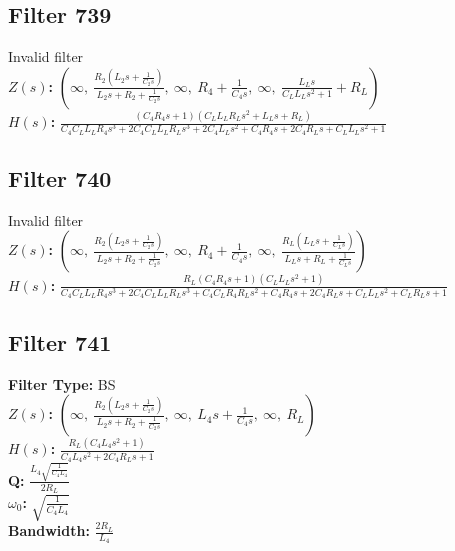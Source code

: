 \documentclass{article}
\begin{document}
\subsection*{Filter 739}
Invalid filter \\ 
\textbf{$Z(s)$:} $\left( \infty, \  \frac{R_{2} \left(L_{2} s + \frac{1}{C_{2} s}\right)}{L_{2} s + R_{2} + \frac{1}{C_{2} s}}, \  \infty, \  R_{4} + \frac{1}{C_{4} s}, \  \infty, \  \frac{L_{L} s}{C_{L} L_{L} s^{2} + 1} + R_{L}\right)$ \\ 
\textbf{$H(s)$:} $\frac{\left(C_{4} R_{4} s + 1\right) \left(C_{L} L_{L} R_{L} s^{2} + L_{L} s + R_{L}\right)}{C_{4} C_{L} L_{L} R_{4} s^{3} + 2 C_{4} C_{L} L_{L} R_{L} s^{3} + 2 C_{4} L_{L} s^{2} + C_{4} R_{4} s + 2 C_{4} R_{L} s + C_{L} L_{L} s^{2} + 1}$ \\ 
\subsection*{Filter 740}
Invalid filter \\ 
\textbf{$Z(s)$:} $\left( \infty, \  \frac{R_{2} \left(L_{2} s + \frac{1}{C_{2} s}\right)}{L_{2} s + R_{2} + \frac{1}{C_{2} s}}, \  \infty, \  R_{4} + \frac{1}{C_{4} s}, \  \infty, \  \frac{R_{L} \left(L_{L} s + \frac{1}{C_{L} s}\right)}{L_{L} s + R_{L} + \frac{1}{C_{L} s}}\right)$ \\ 
\textbf{$H(s)$:} $\frac{R_{L} \left(C_{4} R_{4} s + 1\right) \left(C_{L} L_{L} s^{2} + 1\right)}{C_{4} C_{L} L_{L} R_{4} s^{3} + 2 C_{4} C_{L} L_{L} R_{L} s^{3} + C_{4} C_{L} R_{4} R_{L} s^{2} + C_{4} R_{4} s + 2 C_{4} R_{L} s + C_{L} L_{L} s^{2} + C_{L} R_{L} s + 1}$ \\ 
\subsection*{Filter 741}
\textbf{Filter Type:} BS \\ 
\textbf{$Z(s)$:} $\left( \infty, \  \frac{R_{2} \left(L_{2} s + \frac{1}{C_{2} s}\right)}{L_{2} s + R_{2} + \frac{1}{C_{2} s}}, \  \infty, \  L_{4} s + \frac{1}{C_{4} s}, \  \infty, \  R_{L}\right)$ \\ 
\textbf{$H(s)$:} $\frac{R_{L} \left(C_{4} L_{4} s^{2} + 1\right)}{C_{4} L_{4} s^{2} + 2 C_{4} R_{L} s + 1}$ \\ 
\textbf{Q:} $\frac{L_{4} \sqrt{\frac{1}{C_{4} L_{4}}}}{2 R_{L}}$ \\ 
\textbf{$\omega_0$:} $\sqrt{\frac{1}{C_{4} L_{4}}}$ \\ 
\textbf{Bandwidth:} $\frac{2 R_{L}}{L_{4}}$ \\ 
\end{document}

